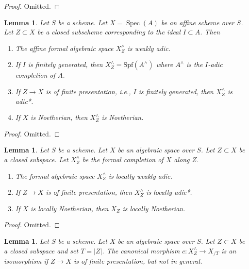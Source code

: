 \documentclass{stacks-project}
\theoremstyle{plain}
\newtheorem{lemma}[subsection]{Lemma}
\theoremstyle{definition}
\theoremstyle{remark}
\numberwithin{equation}{subsection}
\def\Spec{\mathop{\mathrm{Spec}}}
\begin{document}
\begin{proof}
Omitted.
\end{proof}

\begin{lemma}
\label{lemma-affine-formal-completion-subspace-types}
Let $S$ be a scheme. Let $X = \Spec(A)$ be an affine scheme over $S$.
Let $Z \subset X$ be a closed subscheme corresponding to the ideal
$I \subset A$. Then
\begin{enumerate}
\item The affine formal algebraic space $X^\wedge_Z$ is weakly adic.
\item If $I$ is finitely generated, then
$X^\wedge_Z = \text{Spf}(A^\wedge)$ where $A^\wedge$ is the
$I$-adic completion of $A$.
\item If $Z \to X$ is of finite presentation, i.e., $I$ is
finitely generated, then $X^\wedge_Z$ is adic*.
\item If $X$ is Noetherian, then $X^\wedge_Z$ is Noetherian.
\end{enumerate}
\end{lemma}

\begin{proof}
Omitted.
\end{proof}

\begin{lemma}
\label{lemma-formal-completion-subspace-types}
Let $S$ be a scheme. Let $X$ be an algebraic space over $S$.
Let $Z \subset X$ be a closed subspace. Let $X^\wedge_Z$ be the
formal completion of $X$ along $Z$.
\begin{enumerate}
\item The formal algebraic space $X^\wedge_Z$ is locally weakly adic.
\item If $Z \to X$ is of finite presentation,
then $X^\wedge_Z$ is locally adic*.
\item If $X$ is locally Noetherian, then $X_Z$ is locally
Noetherian.
\end{enumerate}
\end{lemma}

\begin{proof}
Omitted.
\end{proof}

\begin{lemma}
\label{lemma-when-isomorphism}
Let $S$ be a scheme. Let $X$ be an algebraic space over $S$.
Let $Z \subset X$ be a closed subspace and set $T = |Z|$. The canonical
morphism $c : X^\wedge_Z \to X_{/T}$ is an isomorphism if $Z \to X$
is of finite presentation, but not in general.
\end{lemma}
\end{document}

